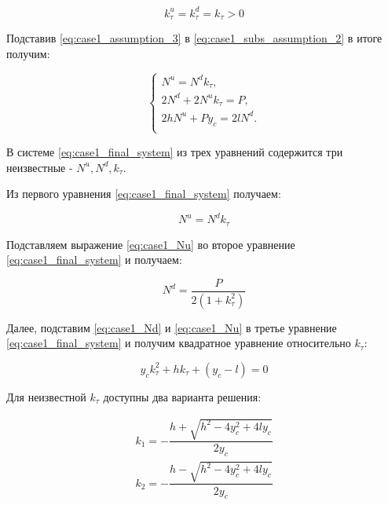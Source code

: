 \begin{equation}
  \label{eq:case1_assumption_3}
  k_\tau^u = k_\tau^d = k_\tau > 0
\end{equation}


Подставив \ref{eq:case1_assumption_3} в \ref{eq:case1_subs_assumption_2} в итоге получим:

\begin{equation}
  \label{eq:case1_final_system}
  \left\{
  \begin{alignedat}{2}
    N^u = N^dk_\tau,\\
    2N^d + 2N^uk_\tau = P,\\
    2hN^u + Py_c = 2lN^d.\\
      \end{alignedat}
  \right.
\end{equation}

В системе \ref{eq:case1_final_system} из трех уравнений содержится три неизвестные - $N^u, N^d, k_\tau$.

Из первого уравнения \ref{eq:case1_final_system} получаем:

\begin{equation}
\label{eq:case1_Nu}
  N^u = N^dk_\tau
\end{equation}

Подставляем выражение \ref{eq:case1_Nu} во второе уравнение \ref{eq:case1_final_system} и получаем:

\begin{equation}
  \label{eq:case1_Nd}
  N^d = \dfrac{P}{2(1+k_\tau^2)}
\end{equation}


Далее, подставим \ref{eq:case1_Nd} и \ref{eq:case1_Nu} в третье уравнение \ref{eq:case1_final_system} и получим квадратное уравнение относительно $k_\tau$:

\begin{equation}
\label{eq:case1_k}
y_ck_\tau^2+hk_\tau + (y_c-l) = 0
\end{equation}

Для неизвестной $k_\tau$ доступны два варианта решения:

\begin{equation}
\label{eq:case1_k12}
  \begin{multlined}
    k_1 = -\dfrac{h + \sqrt{h^2 - 4y_c^2 + 4ly_c}}{2y_c} \\
    k_2 = -\dfrac{h - \sqrt{h^2 - 4y_c^2 + 4ly_c}}{2y_c} \\
  \end{multlined}
\end{equation}


